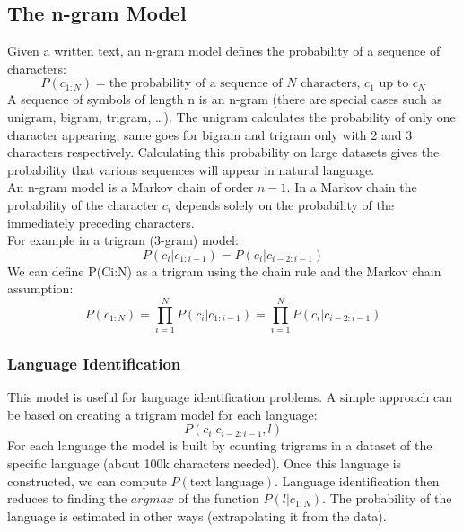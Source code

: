 \subsection{The n-gram Model}
Given a written text, an n-gram model defines the probability of a sequence of characters:
\begin{equation} \tag*{}
    P(c_{1:N}) = \text{the probability of a sequence of } N \text{ characters, } c_1 \text{ up to } c_N
\end{equation}
A sequence of symbols of length n is an n-gram (there are special cases such as unigram, bigram, trigram, \ldots).
The unigram calculates the probability of only one character appearing, same goes for bigram and trigram only with 2 and 3 characters respectively.
Calculating this probability on large datasets gives the probability that various sequences will appear in natural language. \\
\vspace{1em}
An n-gram model is a Markov chain of order $n-1$.
In a Markov chain the probability of the character $c_i$ depends solely on the probability of the immediately preceding characters. \\
For example in a trigram (3-gram) model:
\begin{equation} \tag*{}
    P(c_i | c_{1:i-1}) = P(c_i | c_{i-2:i-1}) 
\end{equation}
We can define P(Ci:N) as a trigram using the chain rule and the Markov chain assumption:
\begin{equation} \tag*{}
    P(c_{1:N}) = \prod_{i=1}^N P(c_i | c_{1:i-1}) = \prod_{i=1}^N P(c_i | c_{i-2:i-1})
\end{equation}

\subsubsection{Language Identification}
This model is useful for language identification problems.
A simple approach can be based on creating a trigram model for each language:
\begin{equation} \tag*{}
    P(c_i | c_{i-2:i-1}, l)
\end{equation}
For each language the model is built by counting trigrams in a dataset of the specific language (about 100k characters needed).
Once this language is constructed, we can compute $P(\text{text}|\text{language})$.
Language identification then reduces to finding the $argmax$ of the function $P(l|c_{1:N})$. 
The probability of the language is estimated in other ways (extrapolating it from the data).

